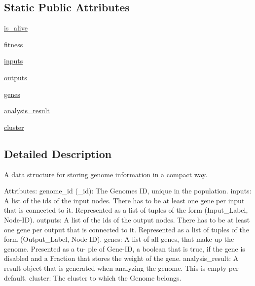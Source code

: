 \subsection*{Static Public Attributes}
\begin{DoxyCompactItemize}
\item 
\hyperlink{classNEAT__PyGenetics_1_1NEAT_1_1GenomeStructures_1_1StorageStructure_1_1StorageGenome_1_1StorageGenome_ae1e47996623ce538b3450f2415d57bc3}{is\+\_\+alive}
\item 
\hyperlink{classNEAT__PyGenetics_1_1NEAT_1_1GenomeStructures_1_1StorageStructure_1_1StorageGenome_1_1StorageGenome_a919c35fa0dfc5d4a81b008bef83c3ac9}{fitness}
\item 
\hyperlink{classNEAT__PyGenetics_1_1NEAT_1_1GenomeStructures_1_1StorageStructure_1_1StorageGenome_1_1StorageGenome_ad0bd7b5a391f6df7f56f60294fee0a00}{inputs}
\item 
\hyperlink{classNEAT__PyGenetics_1_1NEAT_1_1GenomeStructures_1_1StorageStructure_1_1StorageGenome_1_1StorageGenome_a69f429018a927d4919d4468054cf49ea}{outputs}
\item 
\hyperlink{classNEAT__PyGenetics_1_1NEAT_1_1GenomeStructures_1_1StorageStructure_1_1StorageGenome_1_1StorageGenome_a82003c70917d4c96053c6cea930383ce}{genes}
\item 
\hyperlink{classNEAT__PyGenetics_1_1NEAT_1_1GenomeStructures_1_1StorageStructure_1_1StorageGenome_1_1StorageGenome_a4ed1621581430cdf5791c33d1c2f6ac2}{analysis\+\_\+result}
\item 
\hyperlink{classNEAT__PyGenetics_1_1NEAT_1_1GenomeStructures_1_1StorageStructure_1_1StorageGenome_1_1StorageGenome_a4d31fdd32df12f7c1d9c6848b4ae1bcc}{cluster}
\end{DoxyCompactItemize}


\subsection{Detailed Description}
A data structure for storing genome information in a compact way. 

Attributes\+: genome\+\_\+id (\+\_\+id)\+: The Genome\textquotesingle{}s ID, unique in the population. inputs\+: A list of the ids of the input nodes. There has to be at least one gene per input that is connected to it. Represented as a list of tuples of the form (Input\+\_\+\+Label, Node-\/\+ID). outputs\+: A list of the ids of the output nodes. There has to be at least one gene per output that is connected to it. Represented as a list of tuples of the form (Output\+\_\+\+Label, Node-\/\+ID). genes\+: A list of all genes, that make up the genome. Presented as a tu-\/ ple of Gene-\/\+ID, a boolean that is true, if the gene is disabled and a Fraction that stores the weight of the gene. analysis\+\_\+result\+: A result object that is generated when analyzing the genome. This is empty per default. cluster\+: The cluster to which the Genome belongs. 

